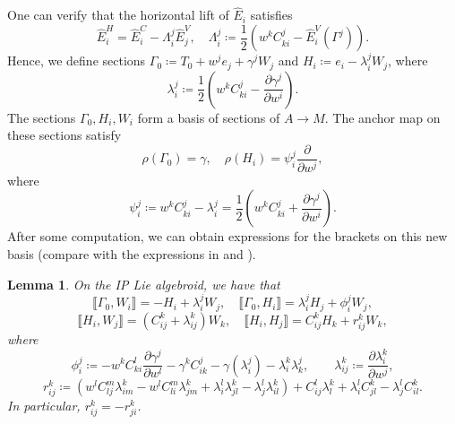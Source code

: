 \documentclass[11pt]{article}
\theoremstyle{plain}
\newtheorem{lemma}{Lemma}
\theoremstyle{definition}
\begin{document}
One can verify that the horizontal lift of $\widehat{E}_i$ satisfies
\begin{equation*}
    \widehat{E}_i^H=\widehat{E}_i^C-\Lambda_i^j\widehat{E}_j^V,\quad \Lambda_i^j\coloneqq \frac{1}{2}\left(w^k C_{ki}^j-\widehat{E}_i^V(\Gamma^j)\right).
\end{equation*}
Hence, we define sections $\Gamma_0\coloneqq T_0+w^j e_j+\gamma^j W_j$ and $H_i\coloneqq e_i-\lambda_i^j W_j$, where
\begin{equation*}
    \lambda_i^j\coloneqq
    \frac{1}{2}\left(w^k C_{ki}^j-\frac{\partial \gamma^j}{\partial w^i}\right).
\end{equation*}
The sections $\Gamma_0,H_i,W_i$ form a basis of sections of $A\to M$. The anchor map on these sections satisfy
\begin{equation*}
    \rho(\Gamma_0)=\gamma,\quad \rho(H_i)=\psi_i^j \frac{\partial}{\partial w^j},
\end{equation*}
where
\begin{equation*}
    \psi_i^j\coloneqq w^k C_{ki}^j-\lambda_i^j=\frac{1}{2}\left(w^k C_{ki}^j+\frac{\partial \gamma^j}{\partial w^i}\right).
\end{equation*}
After some computation, we can obtain expressions for the brackets on this new basis (compare with the expressions in  and ).
\begin{lemma}\label{lem:brackets} On the  IP Lie algebroid, we have that
\begin{equation*}
    \llbracket \Gamma_0,W_i\rrbracket=-H_i+\lambda_i^j W_j,\quad \llbracket \Gamma_0,H_i\rrbracket=\lambda_i^j H_j+\phi_i^j W_j,
\end{equation*}
\begin{equation*}
    \llbracket H_i,W_j\rrbracket=(C_{ij}^k+\lambda_{ij}^k) W_k,\quad \llbracket H_i,H_j\rrbracket=C_{ij}^k H_k+r_{ij}^k W_k,
\end{equation*}
where
\begin{equation*}
    \phi_i^j\coloneqq -w^k C_{ki}^l \frac{\partial \gamma^j}{\partial w^l}-\gamma^k C_{ik}^j-\gamma(\lambda_i^j)-\lambda_i^k\lambda_k^j,\qquad \lambda_{ij}^k\coloneqq \frac{\partial \lambda_i^k}{\partial w^j},
\end{equation*}
\begin{equation*}
    r_{ij}^k\coloneqq \left(w^l C_{lj}^m \lambda_{im}^k-w^l C_{li}^m \lambda_{jm}^k+\lambda_i^l \lambda_{jl}^k-\lambda_j^l \lambda_{il}^k\right)+C_{ij}^l \lambda_l^k+\lambda_i^l C_{jl}^k-\lambda_j^l C_{il}^k.
\end{equation*}
In particular, $r_{ij}^k=-r_{ji}^k$.
\end{lemma}
\end{document}
